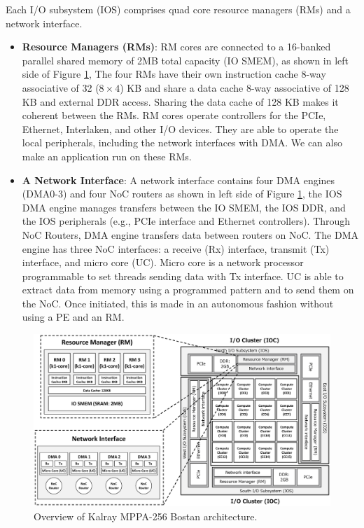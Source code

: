 \documentclass{sig-alternate-05-2015}
\begin{document}
Each I/O subsystem (IOS) comprises quad core resource managers (RMs) and a network interface.
\begin{itemize}
\item \textbf{Resource Managers (RMs)}: RM cores are connected to a 16-banked parallel shared memory of 2MB total capacity (IO SMEM), as shown in left side of Figure \ref{fig:mppa_architecture},
The four RMs have their own instruction cache 8-way associative of 32 ($8 \times 4$) KB and share a data cache 8-way associative of 128 KB and external DDR access.
Sharing the data cache of 128 KB makes it coherent between the RMs.
RM cores operate controllers for the PCIe, Ethernet, Interlaken, and other I/O devices.
They are able to operate the local peripherals, including the network interfaces with DMA.
We can also make an application run on these RMs.
\item \textbf{A Network Interface}: A network interface contains four DMA engines (DMA0-3) and four NoC routers as shown in left side of Figure \ref{fig:mppa_architecture},
the IOS DMA engine manages transfers between the IO SMEM, the IOS DDR, and the IOS peripherals (e.g., PCIe interface and Ethernet controllers).
Through NoC Routers, DMA engine transfers data between routers on NoC.
The DMA engine has three NoC interfaces: a receive (Rx) interface, transmit (Tx) interface, and micro core (UC).
Micro core is a network processor programmable to set threads sending data with Tx interface.
UC is able to extract data from memory using a programmed pattern and to send them on the NoC.
Once initiated, this is made in an autonomous fashion without using a PE and an RM.
\end{itemize}

\begin{figure}[t]
  \centering
  \includegraphics[width=1.0\linewidth]{../figure/mppa_architecture.eps}
  \caption{\label{fig:mppa_architecture}
    Overview of Kalray MPPA-256 Bostan architecture.}
\end{figure}
\end{document}
